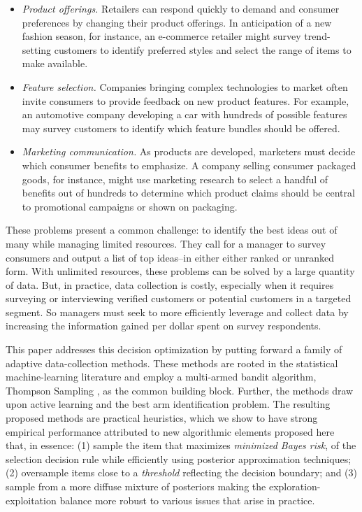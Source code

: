 \documentclass[blindrev,mnsc]{informs3}
\begin{document}
\begin{itemize}


\item \emph{Product offerings.} Retailers can respond quickly to demand and consumer preferences by changing their product offerings. In anticipation of a new fashion season, for instance, an e-commerce retailer might survey trend-setting customers to identify preferred styles and select the range of items to make available.
\item \emph{Feature selection.} Companies bringing complex technologies to market often invite consumers to provide feedback on new product features. For example, an automotive company developing a car with hundreds of possible features may survey customers to identify which feature bundles should be offered.
\item \emph{Marketing communication.} As products are developed, marketers must decide which consumer benefits to emphasize. A company selling consumer packaged goods, for instance, might use marketing research to select a handful of benefits out of hundreds to determine which product claims should be central to promotional campaigns or shown on packaging. 
\end{itemize}

These problems present a common challenge: to identify the best ideas out of many while managing limited resources. They call for a manager to survey consumers and output a list of top ideas--in either either ranked or unranked form. With unlimited resources, these problems can be solved by a large quantity of data. But, in practice, data collection is costly, especially when it requires surveying or interviewing verified customers or potential customers in a targeted segment. So managers must seek to more efficiently leverage and collect data by increasing the information gained per dollar spent on survey respondents. 

This paper addresses this decision optimization by putting forward a family of adaptive data-collection methods. These methods are rooted in the statistical machine-learning literature and employ a multi-armed bandit algorithm, Thompson Sampling \citep{thompson1933likelihood}, as the common building block. Further, the methods draw upon active learning and the best arm identification problem. The resulting proposed methods are practical heuristics, which we show to have strong empirical performance attributed to new algorithmic elements proposed here that, in essence: (1) sample the item that maximizes \emph{minimized Bayes risk}, of the selection decision rule while efficiently using posterior approximation techniques; (2) oversample items close to a \emph{threshold} reflecting the decision boundary; and (3) sample from a more diffuse mixture of posteriors making the exploration-exploitation balance more robust to various issues that arise in practice. 
\end{document}
